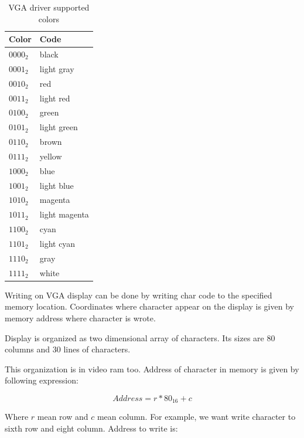 \begin{table}[h]
    \centering
    \begin{tabular}{|l|l|}
        \hline
        \textbf{Color} & \textbf{Code}  \\ \hline
        $0000_{2}$     & black          \\ \hline
        $0001_{2}$     & light gray     \\ \hline
        $0010_{2}$     & red            \\ \hline
        $0011_{2}$     & light red      \\ \hline
        $0100_{2}$     & green          \\ \hline
        $0101_{2}$     & light green    \\ \hline
        $0110_{2}$     & brown          \\ \hline
        $0111_{2}$     & yellow         \\ \hline
        $1000_{2}$     & blue           \\ \hline
        $1001_{2}$     & light blue     \\ \hline
        $1010_{2}$     & magenta        \\ \hline
        $1011_{2}$     & light magenta  \\ \hline
        $1100_{2}$     & cyan           \\ \hline
        $1101_{2}$     & light cyan     \\ \hline
        $1110_{2}$     & gray           \\ \hline
        $1111_{2}$     & white          \\ \hline
    \end{tabular}
    \caption{VGA driver supported colors}
    \label{tab:vga_colors_codes}
\end{table}

Writing on VGA display can be done by writing char code to the specified memory
location. Coordinates where character appear on the display is given by memory
address where character is wrote.

Display is organized as two dimensional array of characters. Its sizes are 80
columns and 30 lines of characters.

This organization is in video ram too. Address of character in memory is given
by following expression:

$$
    Address = r * 80_{16} + c
$$

Where $r$ mean row and $c$ mean column. For example, we want write character to
sixth row and eight column. Address to write is:

